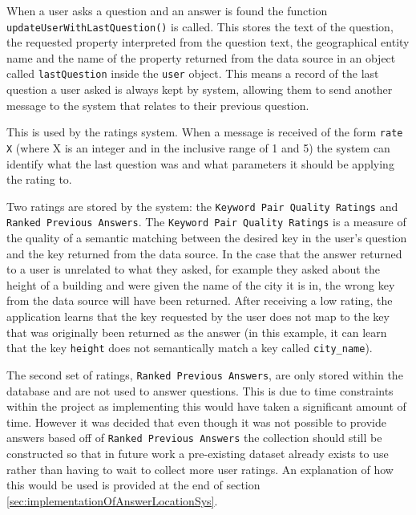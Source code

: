 \documentclass[authoryearcitations]{UoYCSproject}
\begin{document}
When a user asks a question and an answer is found the function \texttt{updateUserWithLastQuestion()} is called. This stores the text of the question, the requested property interpreted from the question text, the geographical entity name and the name of the property returned from the data source in an object called \texttt{lastQuestion} inside the \texttt{user} object. This means a record of the last question a user asked is always kept by system, allowing them to send another message to the system that relates to their previous question. 

This is used by the ratings system. When a message is received of the form \texttt{rate X} (where X is an integer and in the inclusive range of 1 and 5) the system can identify what the last question was and what parameters it should be applying the rating to.

Two ratings are stored by the system: the \texttt{Keyword Pair Quality Ratings} and \texttt{Ranked Previous Answers}. The \texttt{Keyword Pair Quality Ratings} is a measure of the quality of a semantic matching between the desired key in the user's question and the key returned from the data source. In the case that the answer returned to a user is unrelated to what they asked, for example they asked about the height of a building and were given the name of the city it is in, the wrong key from the data source will have been returned. After receiving a low rating, the application learns that the key requested by the user does not map to the key that was originally been returned as the answer (in this example, it can learn that the key \texttt{height} does not semantically match a key called \texttt{city\_name}).

The second set of ratings, \texttt{Ranked Previous Answers}, are only stored within the database and are not used to answer questions. This is due to time constraints within the project as implementing this would have taken a significant amount of time. However it was decided that even though it was not possible to provide answers based off of \texttt{Ranked Previous Answers} the collection should still be constructed so that in future work a pre-existing dataset already exists to use rather than having to wait to collect more user ratings. An explanation of how this would be used is provided at the end of section \ref{sec:implementationOfAnswerLocationSys}.
\end{document}
